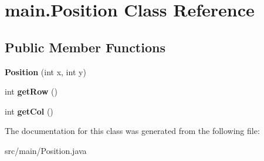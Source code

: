 \hypertarget{classmain_1_1_position}{}\section{main.\+Position Class Reference}
\label{classmain_1_1_position}
\subsection*{Public Member Functions}
\begin{DoxyCompactItemize}
\item 
\mbox{\label{classmain_1_1_position_ab8490181c1618fd65161fa5efcaa4ee9}} 
{\bfseries Position} (int x, int y)
\item 
\mbox{\label{classmain_1_1_position_a87cabaf4efc7d90cb344b624978fa18e}} 
int {\bfseries get\+Row} ()
\item 
\mbox{\label{classmain_1_1_position_abb732f753b21fc6bc2bcf18eb49e0e0d}} 
int {\bfseries get\+Col} ()
\end{DoxyCompactItemize}


The documentation for this class was generated from the following file\+:\begin{DoxyCompactItemize}
\item 
src/main/Position.\+java\end{DoxyCompactItemize}
